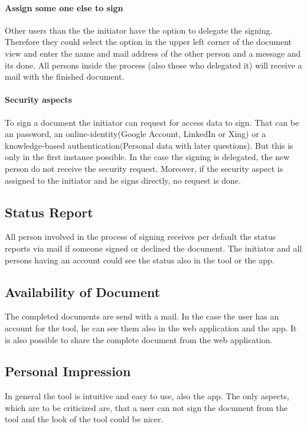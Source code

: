 \paragraph{Assign some one else to sign} Other users than the the initiator have the option to delegate the signing. Therefore they could select the option in the upper left corner of the document view and enter the name and mail address of the other person and a message and its done. All persons inside the process (also those who delegated it) will receive a mail with the finished document.

\paragraph{Security aspects} To sign a document the initiator can request for access data to sign. That can be an password, an online-identity(Google Account, LinkedIn or Xing) or a knowledge-based authentication(Personal data with later questions). But this is only in the first instance possible. In the case the signing is delegated, the new person do not receive the security request. Moreover, if the security aspect is assigned to the initiator and he signs directly, no request is done. 

\subsection{Status Report}
All person involved in the process of signing receives per default the status reports via mail if someone signed or declined the document. The initiator and all persons having an account could see the status also in the tool or the \gls{app}.

\subsection{Availability of Document}
The completed documents are send with a mail. In the case the user has an account for the tool, he can see them also in the web application and the \gls{app}. It is also possible to share the complete document from the web application.

\subsection{Personal Impression}
In general the tool is intuitive and easy to use, also the \gls{app}. The only aspects, which are to be criticized are, that a user can not sign the document from the tool and the look of the tool could be nicer.